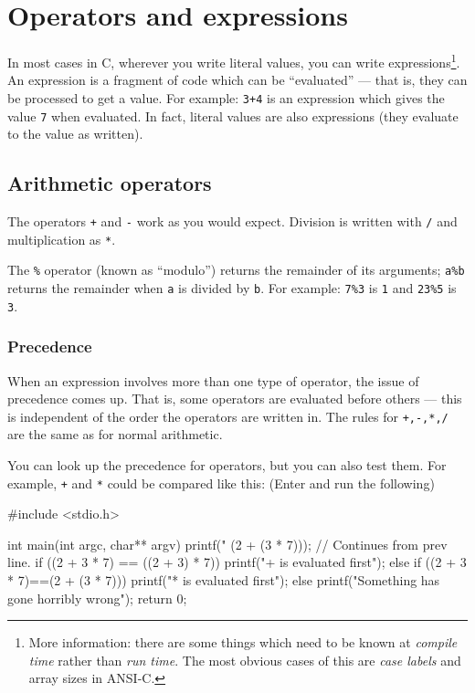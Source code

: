 
\chapter{Operators and expressions}


In most cases in C, wherever you write literal values, you can write expressions\footnote{More information:
there are some things which need to be known at \emph{compile time} rather than \emph{run time}.
The most obvious cases of this are \emph{case labels} and array sizes in ANSI-C.}.
An expression is a fragment of code which can be ``evaluated'' --- that is, they can be processed to get a value.
For example:
\texttt{3+4} is an expression which gives the value \texttt{7} when evaluated.
In fact, literal values are also expressions (they evaluate to the value as written).

\section{Arithmetic operators}

The operators \texttt{+} and \texttt{-} work as you would expect.
Division is written with \texttt{/} and multiplication as \texttt{*}.

The \texttt{\%} operator (known as ``modulo'') returns the remainder of its arguments;
\texttt{a\%b} returns the remainder when \texttt{a} is divided by \texttt{b}.
For example: \lstinline!7%3! is \texttt{1}   and \lstinline!23%5! is \texttt{3}.


\subsection{Precedence}
When an expression involves more than one type of operator, the issue of precedence comes up.
That is, some operators are evaluated before others --- this is independent of the order the operators are written in.
The rules for \texttt{+,-,*,/} are the same as for normal arithmetic.

You can look up the precedence for operators, but you can also test them.
For example, \texttt{+} and \texttt{*} could be compared like this:
(Enter and run the following)
\begin{codeblock}
#include <stdio.h>

int main(int argc, char** argv) {
    printf("%
            (2 + (3 * 7))); // Continues from prev line.
    if ((2 + 3 * 7) == ((2 + 3) * 7)) {
        printf("+ is evaluated first\n");    
    } else if ((2 + 3 * 7)==(2 + (3 * 7))) {
        printf("* is evaluated first\n");
    } else {
        printf("Something has gone horribly wrong\n");
    }
    return 0;
}
\end{codeblock} 

